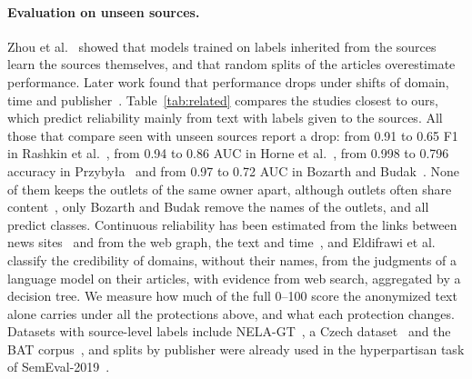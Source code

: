 \documentclass[11pt,a4paper]{article}
\begin{document}
\paragraph{Evaluation on unseen sources.} Zhou et al.~\cite{zhou2021hidden} showed that models trained on labels
inherited from the sources learn the sources themselves, and that random splits of the articles overestimate
performance. Later work found that performance drops under shifts of domain, time and
publisher~\cite{azizov-etal-2024-safari,burdisso-etal-2024-reliability,verhoeven2025yesterday}. Table~\ref{tab:related}
compares the studies closest to ours, which predict reliability mainly from text with labels given to the sources. All
those that compare seen with unseen sources report a drop: from 0.91 to 0.65 F1 in Rashkin et
al.~\cite{rashkin2017truth}, from 0.94 to 0.86 AUC in Horne et al.~\cite{horne2019robust}, from 0.998 to 0.796 accuracy
in Przyby{\l}a~\cite{przybyla2020capturing} and from 0.97 to 0.72 AUC in Bozarth and Budak~\cite{bozarth2020toward}.
None of them keeps the outlets of the same owner apart, although outlets often share
content~\cite{horne2019spirals,gruppi2021tell}, only Bozarth and Budak remove the names of the outlets, and all predict
classes. Continuous reliability has been estimated from the links between news
sites~\cite{burdisso-etal-2024-reliability} and from the web graph, the text and time~\cite{kondrup2026credibench}, and
Eldifrawi et al.~\cite{eldifrawi2026temporal} classify the credibility of domains, without their names, from the
judgments of a language model on their articles, with evidence from web search, aggregated by a decision tree. We measure how much of the full 0--100 score the anonymized text alone carries under all the protections above,
and what each protection changes. Datasets with
source-level labels include NELA-GT~\cite{gruppi2021nela}, a Czech dataset~\cite{bohavcek2022fine} and the BAT
corpus~\cite{DBLP:journals/dbsk/AdjiLS26,batDataset}, and splits by publisher were already used in the hyperpartisan
task of SemEval-2019~\cite{kiesel2019semeval}.
\end{document}
